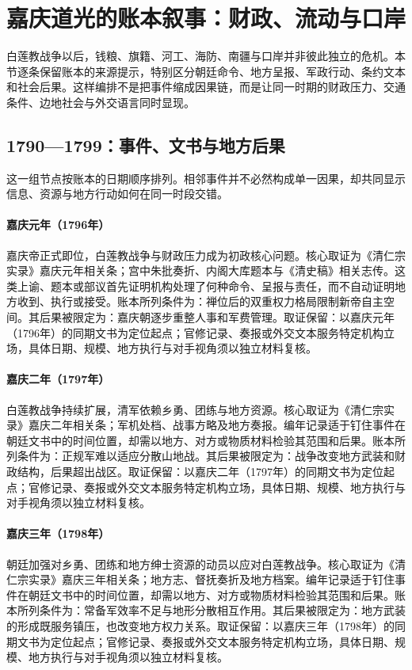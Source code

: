 \section{嘉庆道光的账本叙事：财政、流动与口岸}
白莲教战争以后，钱粮、旗籍、河工、海防、南疆与口岸并非彼此独立的危机。本节逐条保留账本的来源提示，特别区分朝廷命令、地方呈报、军政行动、条约文本和社会后果。这样编排不是把事件缩成因果链，而是让同一时期的财政压力、交通条件、边地社会与外交语言同时显现。
\subsection{1790—1799：事件、文书与地方后果}
这一组节点按账本的日期顺序排列。相邻事件并不必然构成单一因果，却共同显示信息、资源与地方行动如何在同一时段交错。
\hypertarget{ledger:EQ-1796-JIAQING-ACCESSION}{}\paragraph{嘉庆元年（1796年）}嘉庆帝正式即位，白莲教战争与财政压力成为初政核心问题。核心取证为《清仁宗实录》嘉庆元年相关条；宫中朱批奏折、内阁大库题本与《清史稿》相关志传。这类上谕、题本或部议首先证明机构处理了何种命令、呈报与责任，而不自动证明地方收到、执行或接受。账本所列条件为：禅位后的双重权力格局限制新帝自主空间。其后果被限定为：嘉庆朝逐步重整人事和军费管理。取证保留：以嘉庆元年（1796年）的同期文书为定位起点；官修记录、奏报或外交文本服务特定机构立场，具体日期、规模、地方执行与对手视角须以独立材料复核。
\hypertarget{ledger:EQ-1797-WHITE-LOTUS-WAR}{}\paragraph{嘉庆二年（1797年）}白莲教战争持续扩展，清军依赖乡勇、团练与地方资源。核心取证为《清仁宗实录》嘉庆二年相关条；军机处档、战事方略及地方奏报。编年记录适于钉住事件在朝廷文书中的时间位置，却需以地方、对方或物质材料检验其范围和后果。账本所列条件为：正规军难以适应分散山地战。其后果被限定为：战争改变地方武装和财政结构，后果超出战区。取证保留：以嘉庆二年（1797年）的同期文书为定位起点；官修记录、奏报或外交文本服务特定机构立场，具体日期、规模、地方执行与对手视角须以独立材料复核。
\hypertarget{ledger:EQ-1798-MILITIA-MOBILIZATION}{}\paragraph{嘉庆三年（1798年）}朝廷加强对乡勇、团练和地方绅士资源的动员以应对白莲教战争。核心取证为《清仁宗实录》嘉庆三年相关条；地方志、督抚奏折及地方档案。编年记录适于钉住事件在朝廷文书中的时间位置，却需以地方、对方或物质材料检验其范围和后果。账本所列条件为：常备军效率不足与地形分散相互作用。其后果被限定为：地方武装的形成既服务镇压，也改变地方权力关系。取证保留：以嘉庆三年（1798年）的同期文书为定位起点；官修记录、奏报或外交文本服务特定机构立场，具体日期、规模、地方执行与对手视角须以独立材料复核。
